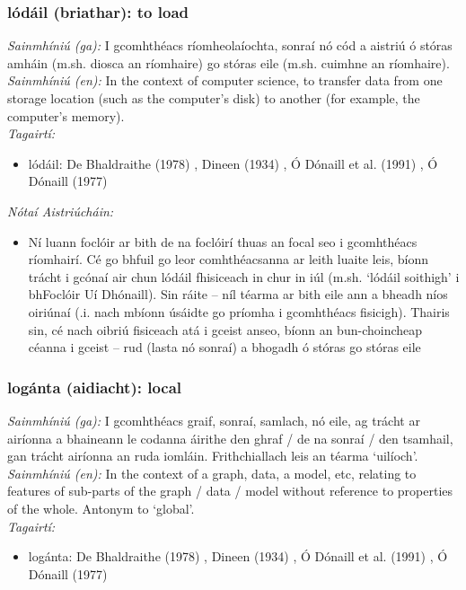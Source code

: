 \documentclass{article}
\begin{document}
\subsubsection*{lódáil (briathar): to load}
 \noindent \textit{Sainmhíniú (ga):} I gcomhthéacs ríomheolaíochta, sonraí nó cód a aistriú ó stóras amháin (m.sh. diosca an ríomhaire) go stóras eile (m.sh. cuimhne an ríomhaire).
\\
 \noindent \textit{Sainmhíniú (en):} In the context of computer science, to transfer data from one storage location (such as the computer's disk) to another (for example, the computer's memory).
\\
 \noindent \textit{Tagairtí:}
\begin{itemize}
	\item lódáil: De Bhaldraithe (1978) \cite{de-bhaldraithe}, Dineen (1934) \cite{dineen}, Ó Dónaill et al. (1991) \cite{focloir-beag}, Ó Dónaill (1977) \cite{odonaill}
\end{itemize}

 \noindent \textit{Nótaí Aistriúcháin:}
\begin{itemize}
	\item Ní luann foclóir ar bith de na foclóirí thuas an focal seo i gcomhthéacs ríomhairí. Cé go bhfuil go leor comhthéacsanna ar leith luaite leis, bíonn trácht i gcónaí air chun lódáil fhisiceach in chur in iúl (m.sh. `lódáil soithigh' i bhFoclóir Uí Dhónaill). Sin ráite -- níl téarma ar bith eile ann a bheadh níos oiriúnaí (.i. nach mbíonn úsáidte go príomha i gcomhthéacs fisicigh). Thairis sin, cé nach oibriú fisiceach atá i gceist anseo, bíonn an bun-choincheap céanna i gceist -- rud (lasta nó sonraí) a bhogadh ó stóras go stóras eile
\end{itemize}


\subsubsection*{logánta (aidiacht): local}
 \noindent \textit{Sainmhíniú (ga):} I gcomhthéacs graif, sonraí, samlach, nó eile, ag trácht ar airíonna a bhaineann le codanna áirithe den ghraf / de na sonraí / den tsamhail, gan trácht airíonna an ruda iomláin. Frithchiallach leis an téarma `uilíoch'.
\\
 \noindent \textit{Sainmhíniú (en):} In the context of a graph, data, a model, etc, relating to features of sub-parts of the graph / data / model without reference to properties of the whole. Antonym to `global'.
\\
 \noindent \textit{Tagairtí:}
\begin{itemize}
	\item logánta: De Bhaldraithe (1978) \cite{de-bhaldraithe}, Dineen (1934) \cite{dineen}, Ó Dónaill et al. (1991) \cite{focloir-beag}, Ó Dónaill (1977) \cite{odonaill}
\end{itemize}
\end{document}
